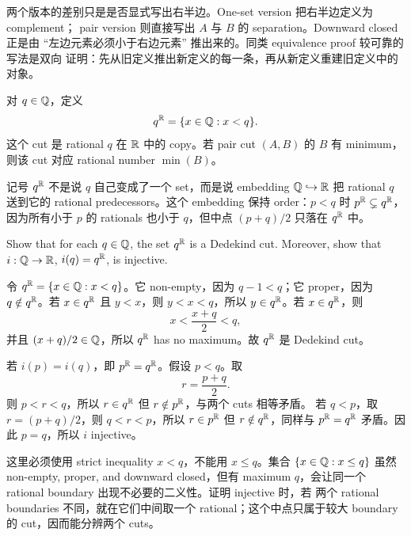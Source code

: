 \begin{explanation}
两个版本的差别只是是否显式写出右半边。One-set version 把右半边定义为 complement；
pair version 则直接写出 \(A\) 与 \(B\) 的 separation。Downward closed 正是由
``左边元素必须小于右边元素'' 推出来的。同类 equivalence proof 较可靠的写法是双向
证明：先从旧定义推出新定义的每一条，再从新定义重建旧定义中的对象。
\end{explanation}

\begin{definition}
对 \(q\in\mathbb{Q}\)，定义
\[
  q^{\mathbb{R}}=\{x\in\mathbb{Q}:x<q\}.
\]
这个 cut 是 rational \(q\) 在 \(\mathbb{R}\) 中的 copy。若 pair cut \((A,B)\) 的 \(B\)
有 minimum，则该 cut 对应 rational number \(\min(B)\)。
\end{definition}

记号 \(q^{\mathbb{R}}\) 不是说 \(q\) 自己变成了一个 set，而是说 embedding
\(\mathbb{Q}\hookrightarrow\mathbb{R}\) 把 rational \(q\) 送到它的 rational predecessors。这个
embedding 保持 order：\(p<q\) 时 \(p^{\mathbb{R}}\subsetneq q^{\mathbb{R}}\)，因为所有小于 \(p\)
的 rationals 也小于 \(q\)，但中点 \((p+q)/2\) 只落在 \(q^{\mathbb{R}}\) 中。

\begin{exerciseblock}
Show that for each \(q\in\mathbb{Q}\), the set \(q^{\mathbb{R}}\) is a Dedekind cut. Moreover,
show that \(i:\mathbb{Q}\to\mathbb{R}\), \(i(q)=q^{\mathbb{R}}\), is injective.
\end{exerciseblock}

\begin{solution}
令 \(q^{\mathbb{R}}=\{x\in\mathbb{Q}:x<q\}\)。它 non-empty，因为 \(q-1<q\)；它 proper，因为
\(q\notin q^{\mathbb{R}}\)。若 \(x\in q^{\mathbb{R}}\) 且 \(y<x\)，则 \(y<x<q\)，所以
\(y\in q^{\mathbb{R}}\)。若 \(x\in q^{\mathbb{R}}\)，则
\[
  x<\frac{x+q}{2}<q,
\]
并且 \((x+q)/2\in\mathbb{Q}\)，所以 \(q^{\mathbb{R}}\) has no maximum。故 \(q^{\mathbb{R}}\) 是
Dedekind cut。

若 \(i(p)=i(q)\)，即 \(p^{\mathbb{R}}=q^{\mathbb{R}}\)。假设 \(p<q\)。取
\[
  r=\frac{p+q}{2}.
\]
则 \(p<r<q\)，所以 \(r\in q^{\mathbb{R}}\) 但 \(r\notin p^{\mathbb{R}}\)，与两个 cuts 相等矛盾。
若 \(q<p\)，取 \(r=(p+q)/2\)，则 \(q<r<p\)，所以 \(r\in p^{\mathbb{R}}\) 但
\(r\notin q^{\mathbb{R}}\)，同样与 \(p^{\mathbb{R}}=q^{\mathbb{R}}\) 矛盾。因此 \(p=q\)，所以
\(i\) injective。
\end{solution}

\begin{explanation}
这里必须使用 strict inequality \(x<q\)，不能用 \(x\leq q\)。集合
\(\{x\in\mathbb{Q}:x\leq q\}\) 虽然 non-empty, proper, and downward closed，但有 maximum
\(q\)，会让同一个 rational boundary 出现不必要的二义性。证明 injective 时，若
两个 rational boundaries 不同，就在它们中间取一个 rational；这个中点只属于较大
boundary 的 cut，因而能分辨两个 cuts。
\end{explanation}

